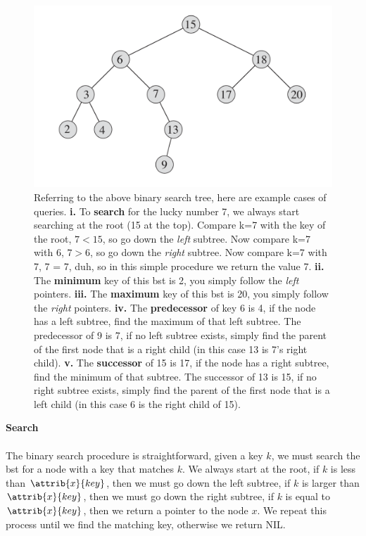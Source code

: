 \documentclass[12pt]{article}
\begin{document}
\begin{figure}[!ht]
\includegraphics[scale=0.3]{bst1}
\caption{
    Referring to the above binary search tree, here are example cases of queries.
    \textbf{i.} To \textbf{search} for the lucky number 7, we always start searching at the root (15 at the top). Compare k=7 with the key of the root, $7 < 15$, so go down the \textit{left} subtree. Now compare k=7 with 6, $7 > 6$, so go down the \textit{right} subtree. Now compare k=7 with 7, 7 = 7, duh, so in this simple procedure we return the value 7.
    \textbf{ii.} The \textbf{minimum} key of this bst is 2, you simply follow the \textit{left} pointers.
    \textbf{iii.} The \textbf{maximum} key of this bst is 20, you simply follow the \textit{right} pointers.
    \textbf{iv.} The \textbf{predecessor} of key 6 is 4, if the node has a left subtree, find the maximum of that left subtree. The predecessor of 9 is 7, if no left subtree exists, simply find the parent of the first node that is a right child (in this case 13 is 7's right child).
    \textbf{v.} The \textbf{successor} of 15 is 17, if the node has a right subtree, find the minimum of that subtree. The successor of 13 is 15, if no right subtree exists, simply find the parent of the first node that is a left child (in this case 6 is the right child of 15).
}
\label{fig:bst_example1}
\end{figure}
\newpage

\textbf{Search}
\\ \\
The binary search procedure is straightforward, given a key $k$, we must search the bst for a node with a key that matches $k$. We always start at the root, if $k$ is less than $\attrib{x}{key}$, then we must go down the left subtree, if $k$ is larger than $\attrib{x}{key}$, then we must go down the right subtree, if $k$ is equal to $\attrib{x}{key}$, then we return a pointer to the node $x$. We repeat this process until we find the matching key, otherwise we return NIL.
\end{document}
